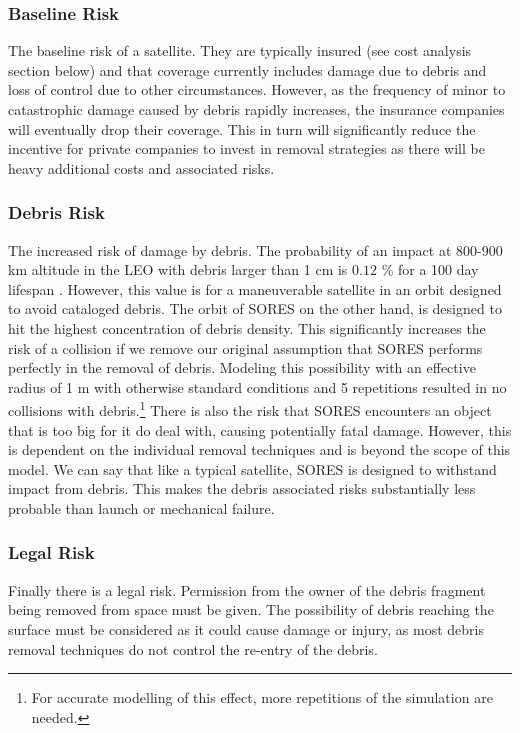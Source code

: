 \documentclass[12pt]{scrartcl}
\begin{document}
\subsubsection{Baseline Risk}
The baseline risk of a satellite. They are typically insured (see cost analysis section below) and that coverage currently includes damage due to debris and loss of control due to other circumstances. However, as the frequency of minor to catastrophic damage caused by debris rapidly increases, the insurance companies will eventually drop their coverage. This in turn will significantly reduce the incentive for private companies to invest in removal strategies as there will be heavy additional costs and associated risks.
\subsubsection{Debris Risk}
The increased risk of damage by debris. The probability of an impact at 800-900 km altitude in the LEO with debris larger than 1 cm is \(0.12\) \(\%\) for a 100 day lifespan \cite{risk}. However, this value is for a maneuverable satellite in an orbit designed to avoid cataloged debris. The orbit of SORES on the other hand, is designed to hit the highest concentration of debris density. This significantly increases the risk of a collision if we remove our original assumption that SORES performs perfectly in the removal of debris. Modeling this possibility with an effective radius of 1 m with otherwise standard conditions and 5 repetitions resulted in no collisions with debris.\footnote{For accurate modelling of this effect, more repetitions of the simulation are needed.} There is also the risk that SORES encounters an object that is too big for it do deal with, causing potentially fatal damage. However, this is dependent on the individual removal techniques and is beyond the scope of this model. We can say that like a typical satellite, SORES is designed to withstand impact from debris. This makes the debris associated risks substantially less probable than launch or mechanical failure.
\subsubsection{Legal Risk}
Finally there is a legal risk. Permission from the owner of the debris fragment being removed from space must be given. The possibility of debris reaching the surface must be considered as it could cause damage or injury, as most debris removal techniques do not control the re-entry of the debris.
\end{document}
